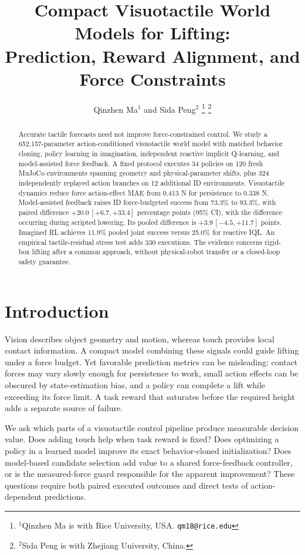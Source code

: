 \documentclass[letterpaper,10pt,conference]{ieeeconf}
\title{\LARGE\bf Compact Visuotactile World Models for Lifting:\protect\\
Prediction, Reward Alignment, and Force Constraints}
\author{Qinzhen Ma$^{1}$ and Sida Peng$^{2}$%
\thanks{$^{1}$Qinzhen Ma is with Rice University, USA. {\tt\small qm18@rice.edu}}%
\thanks{$^{2}$Sida Peng is with Zhejiang University, China.}}
\begin{document}
\maketitle
\thispagestyle{empty}
\pagestyle{empty}

\begin{abstract}
Accurate tactile forecasts need not improve force-constrained control.
We study a 652,157-parameter action-conditioned visuotactile world model with
matched behavior cloning, policy learning in imagination, independent
reactive implicit Q-learning, and model-assisted force feedback.
A fixed protocol executes 34 policies on 120 fresh MuJoCo environments
spanning geometry and physical-parameter shifts, plus 324 independently
replayed action branches on 12 additional ID environments. Visuotactile dynamics reduce force action-effect MAE from 0.413 N for persistence to 0.338 N. Model-assisted feedback raises ID force-budgeted success from 73.3\% to 93.3\%, with paired difference \mbox{$+20.0\,[+6.7,+33.4]$} percentage points (95\% CI), with the difference occurring during scripted lowering. Its pooled difference is \mbox{$+3.9\,[-4.5,+11.7]$} points. Imagined RL achieves 11.9\% pooled joint success versus 25.0\% for reactive IQL. 
An empirical tactile-residual stress test adds 330 executions.
The evidence concerns rigid-box lifting after a common approach, without
physical-robot transfer or a closed-loop safety guarantee.
\end{abstract}

\section{Introduction}
Vision describes object geometry and motion, whereas touch provides local
contact information. A compact model combining these signals could guide
lifting under a force budget. Yet favorable prediction metrics can be
misleading: contact forces may vary slowly enough for persistence to work,
small action effects can be obscured by state-estimation bias, and a policy
can complete a lift while exceeding its force limit. A task reward that
saturates before the required height adds a separate source of failure.

We ask which parts of a visuotactile control pipeline produce measurable
decision value. Does adding touch help when task reward is fixed? Does
optimizing a policy in a learned model improve its exact behavior-cloned
initialization? Does model-based candidate selection add value to a shared
force-feedback controller, or is the measured-force guard responsible for the
apparent improvement? These questions require both paired executed outcomes
and direct tests of action-dependent predictions.
\end{document}
